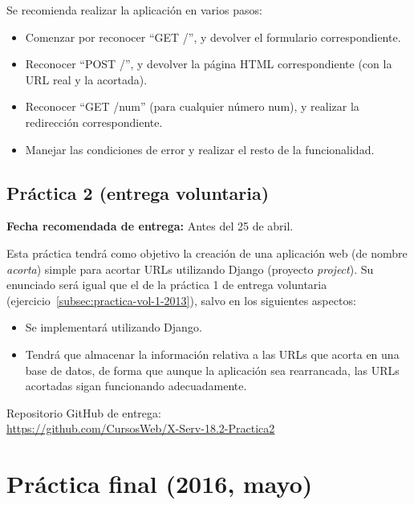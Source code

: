 Se recomienda realizar la aplicación en varios pasos:

\begin{itemize}
\item Comenzar por reconocer ``GET /'', y devolver el formulario correspondiente.
\item Reconocer ``POST /'', y devolver la página HTML correspondiente (con la URL real y la acortada).
\item Reconocer ``GET /num'' (para cualquier número num), y realizar la redirección correspondiente.
\item Manejar las condiciones de error y realizar el resto de la funcionalidad.
\end{itemize}

\subsection{Práctica 2 (entrega voluntaria)}
\label{subsec:practica-vol-2-2015}

\textbf{Fecha recomendada de entrega:} Antes del 25 de abril.

Esta práctica tendrá como objetivo la creación de una aplicación web (de nombre \emph{acorta}) simple para acortar URLs utilizando Django (proyecto \emph{project}). Su enunciado será igual que el de la práctica 1 de entrega voluntaria (ejercicio~\ref{subsec:practica-vol-1-2013}), salvo en los siguientes aspectos:

\begin{itemize}
\item Se implementará utilizando Django.
\item Tendrá que almacenar la información relativa a las URLs que acorta en una base de datos, de forma que aunque la aplicación sea rearrancada, las URLs acortadas sigan funcionando adecuadamente.
\end{itemize}

Repositorio GitHub de entrega: \\
\url{https://github.com/CursosWeb/X-Serv-18.2-Practica2}

\newpage

\section{Práctica final (2016, mayo)}
\label{practica-final-2016-05}

